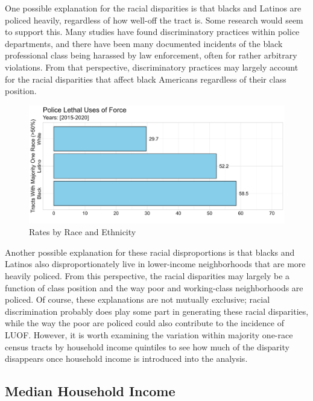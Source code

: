 \documentclass[12pt]{article}
\begin{document}
One possible explanation for the racial disparities is that blacks and Latinos are policed heavily, regardless of how well-off the tract is. Some research would seem to support this. Many studies have found discriminatory practices within police departments, and there have been many documented incidents of the black professional class being harassed by law enforcement, often for rather arbitrary violations. From that perspective, discriminatory practices may largely account for the racial disparities that affect black Americans regardless of their class position. 

\begin{figure}[H]
  \centering %
  \includegraphics[width=\linewidth]{images/majority_race_only_ind}
  \captionsetup{justification=centering, margin=2cm}
  \caption[Rates by Race and Ethnicity]{Rates by Race and Ethnicity}
  \label{fig:race_ethnicity}
\end{figure}

Another possible explanation for these racial disproportions is that blacks and Latinos also disproportionately live in lower-income neighborhoods that are more heavily policed. From this perspective, the racial disparities may largely be a function of class position and the way poor and working-class neighborhoods are policed. Of course, these explanations are not mutually exclusive; racial discrimination probably does play some part in generating these racial disparities, while the way the poor are policed could also contribute to the incidence of LUOF. However, it is worth examining the variation within majority one-race census tracts by household income quintiles to see how much of the disparity disappears once household income is introduced into the analysis.

\subsection{Median Household Income}
\end{document}
